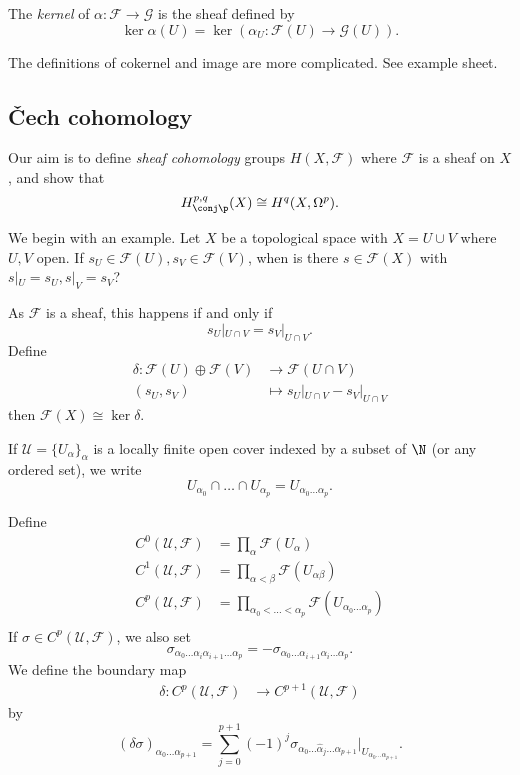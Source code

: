 \documentclass[a4paper]{article}
\begin{document}
\begin{definition}
  The \emph{kernel} of \(\alpha: \mathcal F \to \mathcal G\) is the sheaf defined by
  \[
    \ker \alpha(U) = \ker (\alpha_U: \mathcal F(U) \to \mathcal G(U)).
  \]
\end{definition}

The definitions of cokernel and image are more complicated. See example sheet.

\subsection{Čech cohomology}

Our aim is to define \emph{sheaf cohomology} groups \(H(X, \mathcal F)\) where \(\mathcal F\) is a sheaf on \(X\), and show that
\[
  H_{\conj \p}^{p, q}(X) \cong H^q(X, \Omega^p).
\]

We begin with an example. Let \(X\) be a topological space with \(X = U \cup V\) where \(U, V\) open. If \(s_U \in \mathcal F(U), s_V \in \mathcal F(V)\), when is there \(s \in \mathcal F(X)\) with \(s|_U = s_U, s|_V = s_V\)?

As \(\mathcal F\) is a sheaf, this happens if and only if
\[
  s_U|_{U \cap V} = s_V|_{U \cap V}.
\]
Define
\begin{align*}
  \delta: \mathcal F(U) \oplus \mathcal F(V) &\to \mathcal F(U \cap V) \\
  (s_U, s_V) &\mapsto s_U|_{U \cap V} - s_V|_{U \cap V}
\end{align*}
then \(\mathcal F(X) \cong \ker \delta\).

\begin{notation}
  If \(\mathcal U = \{U_\alpha\}_\alpha\) is a locally finite open cover indexed by a subset of \(\N\) (or any ordered set), we write
  \[
    U_{\alpha_0} \cap \dots \cap U_{\alpha_p} = U_{\alpha_0 \dots \alpha_p}.
  \]
\end{notation}

Define
\begin{align*}
  C^0(\mathcal U, \mathcal F) &= \prod_\alpha \mathcal F(U_\alpha) \\
  C^1(\mathcal U, \mathcal F) &= \prod_{\alpha < \beta} \mathcal F(U_{\alpha\beta}) \\
  C^p(\mathcal U, \mathcal F) &= \prod_{\alpha_0 < \dots < \alpha_p} \mathcal F(U_{\alpha_0 \dots \alpha_p}) \\
\end{align*}
If \(\sigma \in C^p(\mathcal U, \mathcal F)\), we also set
\[
  \sigma_{\alpha_0 \dots \alpha_i \alpha_{i + 1} \dots \alpha_p} = - \sigma_{\alpha_0 \dots \alpha_{i + 1} \alpha_i \dots \alpha_p}.
\]
We define the boundary map
\begin{align*}
  \delta: C^p(\mathcal U, \mathcal F) &\to C^{p + 1}(\mathcal U, \mathcal F)
\end{align*}
by
\[
  (\delta\sigma)_{\alpha_0 \dots \alpha_{p + 1}} = \sum_{j = 0}^{p + 1} (-1)^j \sigma_{\alpha_0 \dots \hat \alpha_j \dots \alpha_{p + 1}} |_{U_{\alpha_0 \dots \alpha_{p + 1}}}.
\]
\end{document}
